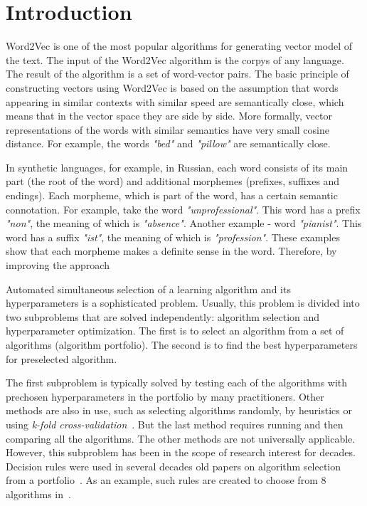\documentclass{svproc}
\begin{document}
\section{Introduction}

Word2Vec is one of the most popular algorithms for generating vector model of the text. The input of the Word2Vec algorithm is the corpys of any language. The result of the algorithm is a set of word-vector pairs. The basic principle of constructing vectors using Word2Vec is based on the assumption that words appearing in similar contexts with similar speed are semantically close, which means that in the vector space they are side by side. More formally, vector representations of the words with similar semantics have very small cosine distance. For example, the words \emph{"bed"} and \emph{"pillow"} are semantically close. 

In synthetic languages, for example, in Russian, each word consists of its main part (the root of the word) and additional morphemes (prefixes, suffixes and endings). Each morpheme, which is part of the word, has a certain semantic connotation. For example, take the word \emph{"unprofessional"}. This word has a prefix \emph{"non"}, the meaning of which is \emph{"absence"}. Another example - word \emph{"pianist"}. This word has a suffix \emph{"ist"}, the meaning of which is \emph{"profession"}. These examples show that each morpheme makes a definite sense in the word. Therefore, by improving the approach



Automated simultaneous selection of a learning algorithm and its hyperparameters is a sophisticated problem. Usually, this problem is divided into two subproblems that are solved independently: algorithm selection and hyperparameter optimization. The first is to select an algorithm from a set of algorithms (algorithm portfolio). The second is to find the best hyperparameters for preselected algorithm.

The first subproblem is typically solved by testing each of the algorithms with prechosen hyperparameters in the portfolio by many practitioners. Other methods are also in use, such as selecting algorithms randomly, by heuristics or using \emph{k-fold cross-validation}~\cite{kfoldcv}. But the last method requires running and then comparing all the algorithms. The other methods are not universally applicable. However, this subproblem has been in the scope of research interest for decades. Decision rules were used in several decades old papers on algorithm selection from a portfolio~\cite{aha}. As an example, such rules are created to choose from 8 algorithms in~\cite{alism}.
\end{document}
